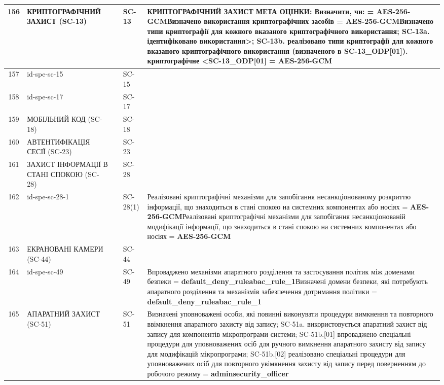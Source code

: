 \documentclass[10pt]{article}
\begin{document}
\begin{longtable}{|c|>{\raggedright\arraybackslash}p{2.5cm}|>{\raggedright\arraybackslash}p{4.5cm}|>{\raggedright\arraybackslash}p{3cm}|>{\raggedright\arraybackslash}p{4.5cm}|}
156 & КРИПТОГРАФІЧНИЙ ЗАХИСТ (SC-13) &  & SC-13 & КРИПТОГРАФІЧНИЙ ЗАХИСТ МЕТА ОЦІНКИ: Визначити, чи: = \textbf{AES-256-GCM}\newline Визначено використання криптографічних засобів = \textbf{AES-256-GCM}\newline Визначено типи криптографії для кожного вказаного криптографічного використання; SC-13a. ідентифіковано використання>; SC-13b. реалізовано типи криптографії для кожного вказаного криптографічного використання (визначеного в SC-13\_\allowbreak{}ODP[01]). криптографічне <SC-13\_\allowbreak{}ODP[01] = \textbf{AES-256-GCM} \\ \hline
157 & id-spe-sc-15 &  & SC-15 &  \\ \hline
158 & id-spe-sc-17 &  & SC-17 &  \\ \hline
159 & МОБІЛЬНИЙ КОД (SC-18) &  & SC-18 &  \\ \hline
160 & АВТЕНТИФІКАЦІЯ СЕСІЇ (SC-23) &  & SC-23 &  \\ \hline
161 & ЗАХИСТ ІНФОРМАЦІЇ В СТАНІ СПОКОЮ (SC-28) &  & SC-28 &  \\ \hline
162 & id-spe-sc-28-1 &  & SC-28(1) & Реалізовані криптографічні механізми для запобігання несанкціонованому розкриттю інформації, що знаходиться в стані спокою на системних компонентах або носіях = \textbf{AES-256-GCM}\newline Реалізовані криптографічні механізми для запобігання несанкціонованій модифікації інформації, що знаходиться в стані спокою на системних компонентах або носіях = \textbf{AES-256-GCM} \\ \hline
163 & ЕКРАНОВАНІ КАМЕРИ (SC-44) &  & SC-44 &  \\ \hline
164 & id-spe-sc-49 &  & SC-49 & Впроваджено механізми апаратного розділення та застосування політик між доменами безпеки = \textbf{default\_\allowbreak{}deny\_\allowbreak{}ruleabac\_\allowbreak{}rule\_\allowbreak{}1}\newline Визначені домени безпеки, які потребують апаратного розділення та механізмів забезпечення дотримання політики = \textbf{default\_\allowbreak{}deny\_\allowbreak{}ruleabac\_\allowbreak{}rule\_\allowbreak{}1} \\ \hline
165 & АПАРАТНИЙ ЗАХИСТ (SC-51) &  & SC-51 & Визначені уповноважені особи, які повинні виконувати процедури вимкнення та повторного ввімкнення апаратного захисту від запису; SC-51a. використовується апаратний захист від запису для компонентів мікропрограми системи; SC-51b.[01] впроваджено спеціальні процедури для уповноважених осіб для ручного вимкнення апаратного захисту від запису для модифікацій мікропрограми; SC-51b.[02] реалізовано спеціальні процедури для уповноважених осіб для повторного увімкнення захисту від запису перед поверненням до робочого режиму = \textbf{adminsecurity\_\allowbreak{}officer} \\ \hline

\end{longtable}
\end{document}
